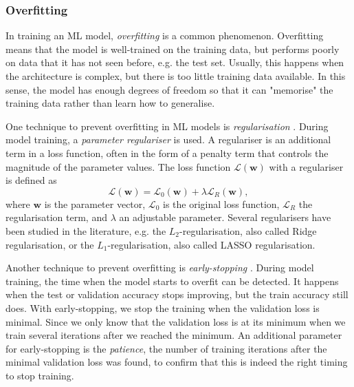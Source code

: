\subsubsection{Overfitting} \label{sec:overfitting}
In training an ML model, \textit{overfitting} \cite{ying_overview_2019} is a common phenomenon. Overfitting means that the model is well-trained on the training data, but performs poorly on data that it has not seen before, e.g. the test set. Usually, this happens when the architecture is complex, but there is too little training data available. In this sense, the model has enough degrees of freedom so that it can "memorise" the training data rather than learn how to generalise.

One technique to prevent overfitting in ML models is \textit{regularisation} \cite{ying_overview_2019}. During model training, a \textit{parameter regulariser} is used. A regulariser is an additional term in a loss function, often in the form of a penalty term that controls the magnitude of the parameter values. The loss function $\mathcal{L}(\mathbf{w})$ with a regulariser is defined as
\begin{equation}
    \mathcal{L}(\mathbf{w}) = \mathcal{L}_0(\mathbf{w}) + \lambda \mathcal{L}_R(\mathbf{w}),
\end{equation}
where $\mathbf{w}$ is the parameter vector, $\mathcal{L}_0$ is the original loss function, $\mathcal{L}_R$ the regularisation term, and $\lambda$ an adjustable parameter. Several regularisers have been studied in the literature, e.g. the  $L_2$-regularisation, also called Ridge regularisation, or the $L_1$-regularisation, also called LASSO regularisation.

Another technique to prevent overfitting is \textit{early-stopping} \cite{ying_overview_2019}. During model training, the time when the model starts to overfit can be detected. It happens when the test or validation accuracy stops improving, but the train accuracy still does. With early-stopping, we stop the training when the validation loss is minimal. Since we only know that the validation loss is at its minimum when we train several iterations after we reached the minimum. An additional parameter for early-stopping is the \textit{patience}, the number of training iterations after the minimal validation loss was found, to confirm that this is indeed the right timing to stop training.

